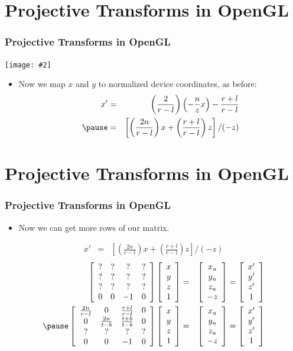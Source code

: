 \documentclass[slidestop,xcolor=pst]{beamer}
\newcommand{\graphc}[2]{\centerline{\texttt{[image: \#2]}}}
\newcommand{\sect}[1]{
\section{#1}
\begin{frame}[fragile]\frametitle{#1}
}
\begin{document}
\sect{Projective Transforms in OpenGL}
\graphc{.8}{gl_projectionmatrix01.png}
\begin{itemize}
\item Now we map $x$ and $y$ to normalized device coordinates, as
  before: 
\begin{eqnarray*}
 x' &=& \left(\frac{2}{r-l}\right)\left(-\frac{n}{z}x\right)-\frac{r+l}{r-l}\\
\pause
 &=& \left[\left(\frac{2n}{r-l}\right)x + \left(\frac{r+l}{r-l}\right)z\right]/(-z)
\end{eqnarray*}
\end{itemize}
\end{frame}


\sect{Projective Transforms in OpenGL}
\begin{itemize}
\item Now we can get more rows of our matrix.
\end{itemize}
\begin{eqnarray*}
 x'  &=& \left[\left(\frac{2n}{r-l}\right)x
      + \left(\frac{r+l}{r-l}\right)z\right]/(-z)
\end{eqnarray*}
\begin{eqnarray*}
\wmhomo
{?&?&?&?}
{?&?&?&?}
{?&?&?&?}
{0&0&-1&0}
\phomo{x\\y\\z}
&=&\whomo{x_u\\y_u\\z_u\\-z}
=\whomo{x'\\y'\\z'\\1}\\
\pause
\wmhomo
{\frac{2n}{r-l}& 0 & \frac{r+l}{r-l}& 0}
{0 & \frac{2n}{t-b}&\frac{t+b}{t-b}& 0}
{?&?&?&?}
{0&0&-1&0}
\phomo{x\\y\\z}
&=&\whomo{x_u\\y_u\\z_u\\-z}
=\whomo{x'\\y'\\z'\\1}\\
  \end{eqnarray*}
\end{frame}
\end{document}

